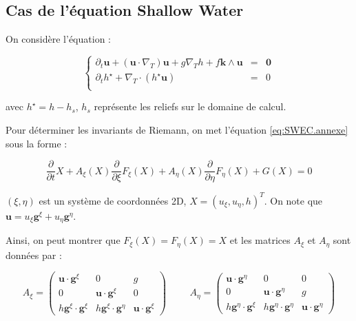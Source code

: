 \subsection{Cas de l'équation Shallow Water}

On considère l'équation :

\begin{equation}
\left\lbrace
\begin{array}{rcl}
\partial_t \mathbf{u} + \left( \mathbf{u} \cdot \nabla_T \right) \mathbf{u} + g \nabla_T h + f \mathbf{k} \wedge \mathbf{u} & = & \mathbf{0}\\
\partial_t h^{\star} + \nabla_T \cdot \left( h^{\star} \mathbf{u} \right) & = & 0 \\ 
\end{array}
\right.
\label{eq:SWEC.annexe}
\end{equation}

avec $h^{\star} = h - h_s$, $h_s$ représente les reliefs sur le domaine de calcul.

Pour déterminer les invariants de Riemann, on met l'équation \eqref{eq:SWEC.annexe} sous la forme :

\begin{equation}
\dfrac{\partial}{\partial t} X + A_{\xi}(X) \dfrac{\partial}{\partial \xi} F_{\xi}(X) + A_{\eta}(X) \dfrac{\partial}{\partial \eta} F_{\eta}(X) + G(X) = 0
\end{equation}

$(\xi, \eta)$ est un système de coordonnées 2D, $X=(u_{\xi}, u_{\eta}, h)^T$. On note que $\mathbf{u} = u_{\xi} \mathbf{g}^{\xi}+u_{\eta} \mathbf{g}^{\eta}$. 

Ainsi, on peut montrer que $F_{\xi}(X) = F_{\eta}(X) = X$ et les matrices $A_{\xi}$ et $A_{\eta}$ sont données par :

\begin{equation}
A_{\xi} = \begin{pmatrix}
\mathbf{u} \cdot \mathbf{g}^{\xi} & 0 & g \\
0 & \mathbf{u} \cdot \mathbf{g}^{\xi} & 0 \\
h \mathbf{g}^{\xi} \cdot \mathbf{g}^{\xi} & h \mathbf{g}^{\xi} \cdot \mathbf{g}^{\eta} & \mathbf{u} \cdot \mathbf{g}^{\xi} 
\end{pmatrix}
\hspace{1cm}
A_{\eta} = \begin{pmatrix}
\mathbf{u} \cdot \mathbf{g}^{\eta} & 0 & 0 \\
0 & \mathbf{u} \cdot \mathbf{g}^{\eta}  & g \\
h \mathbf{g}^{\eta} \cdot \mathbf{g}^{\xi}  & h \mathbf{g}^{\eta} \cdot \mathbf{g}^{\eta}  & \mathbf{u} \cdot \mathbf{g}^{\eta} 
\end{pmatrix}
\end{equation}

